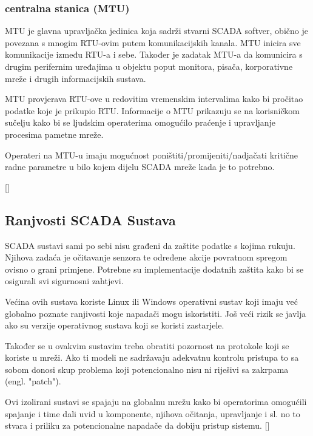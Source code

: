 \documentclass[times, utf8, zavrsni]{fer}
\begin{document}
\subsubsection{centralna stanica (MTU)}
MTU je glavna upravljačka jedinica koja sadrži stvarni SCADA softver, obično je povezana s mnogim RTU-ovim putem komunikacijskih kanala. MTU inicira sve komunikacije između RTU-a i sebe. Također je zadatak MTU-a da komunicira s drugim perifernim uređajima u objektu poput monitora, pisača, korporativne mreže i drugih informacijskih sustava. 

MTU provjerava RTU-ove u redovitim vremenskim intervalima kako bi pročitao podatke koje je prikupio RTU. Informacije o MTU prikazuju se na korisničkom sučelju kako bi se ljudskim operaterima omogućilo praćenje i upravljanje procesima pametne mreže. 

Operateri na MTU-u imaju mogućnost poništiti/promijeniti/nadjačati kritične radne parametre u bilo kojem dijelu SCADA mreže kada je to potrebno.

[\cite{scada-thesis}]

\subsection{Ranjvosti SCADA Sustava}
SCADA sustavi sami po sebi nisu građeni da zaštite podatke s kojima rukuju. Njihova zadaća je očitavanje senzora te određene akcije povratnom spregom ovisno o grani primjene. Potrebne su implementacije dodatnih zaštita kako bi se osigurali svi sigurnosni zahtjevi. 

Većina ovih sustava koriste Linux ili Windows operativni sustav koji imaju već globalno poznate ranjivosti koje napadači mogu iskoristiti. 
Još veći rizik se javlja ako su verzije operativnog sustava koji se koristi zastarjele.

Također se u ovakvim sustavim treba obratiti pozornost na protokole koji se koriste u mreži. Ako ti modeli ne sadržavaju adekvatnu kontrolu pristupa to sa sobom donosi skup problema koji potencionalno nisu ni riješivi sa zakrpama (engl. "patch").

Ovi izolirani sustavi se spajaju na globalnu mrežu kako bi operatorima omogućili spajanje i time dali uvid u komponente, njihova očitanja, upravljanje i sl. no to stvara i priliku za potencionalne napadače da dobiju pristup sistemu.
[\cite{scada-thesis}]
\end{document}
